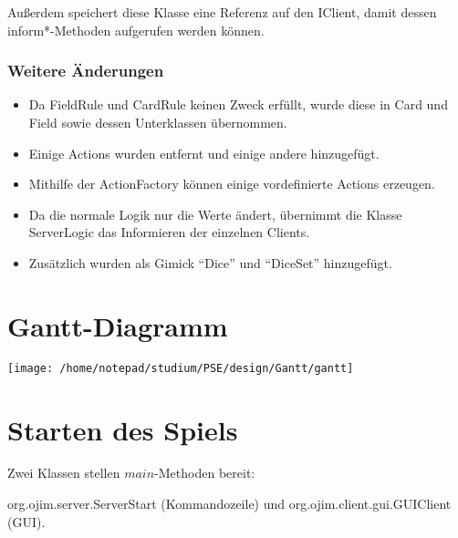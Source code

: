\documentclass[a4paper,10pt]{article}
\begin{document}
Außerdem speichert diese Klasse eine Referenz auf den IClient, damit dessen inform*-Methoden aufgerufen werden können.

\subsubsection{Weitere Änderungen}
\begin{itemize}
\item Da FieldRule und CardRule keinen Zweck erfüllt, wurde diese in Card und Field sowie dessen Unterklassen übernommen.
\item Einige Actions wurden entfernt und einige andere hinzugefügt.
\item Mithilfe der ActionFactory können einige vordefinierte Actions erzeugen.
\item Da die normale Logik nur die Werte ändert, übernimmt die Klasse ServerLogic das Informieren der einzelnen Clients.
\item Zusätzlich wurden als Gimick ``Dice'' und ``DiceSet'' hinzugefügt.
\end{itemize}

\newpage
\section{Gantt-Diagramm}
\texttt{[image: /home/notepad/studium/PSE/design/Gantt/gantt]}
\section{Starten des Spiels}
Zwei Klassen stellen $main$-Methoden bereit: 

org.ojim.server.ServerStart (Kommandozeile) und org.ojim.client.gui.GUIClient (GUI).
\end{document}
